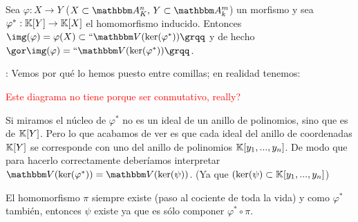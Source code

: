 \begin{lemma}[Clave]\label{lema:morf}
	Sea  $\varphi: X \rightarrow Y$ ($X  \subset \Akn,\, Y \subset \A_k^m$) un morfismo y sea $\varphi^*:\mathbb{K}[Y] \rightarrow \mathbb{K}[X]$ el homomorfismo inducido. Entonces $\img(\varphi)=\varphi(X) \subset ``\V(\ker (\varphi^*))\grqq$ y de hecho $\cls{\img(\varphi)}=``\V(\ker(\varphi^*))\grqq$.
\end{lemma}

	\notacion: Vemos por qué lo hemos puesto entre comillas; en realidad tenemos:


	
	\textcolor{red}{Este diagrama no tiene porque ser conmutativo, really?}
	



	Si miramos el núcleo de $\varphi^*$ no es un ideal de un anillo de polinomios, sino que es de $\mathbb{K}[Y]$. Pero lo que acabamos de ver es que cada ideal del anillo de coordenadas $\mathbb{K}[Y]$ se corresponde con uno del anillo de polinomios $\mathbb{K}[y_1,...,y_n]$. De modo que para hacerlo correctamente deberíamos interpretar $\V(\ker(\varphi^*))= \V(\ker(\psi))$. (Ya que $(\ker(\psi) \subset \mathbb{K}[y_1,...,y_n]$)

	El homomorfismo $\pi$ siempre existe (paso al cociente de toda la vida) y como $\varphi^*$ también, entonces $\psi$ existe ya que es sólo componer $\varphi^* \circ \pi$.

